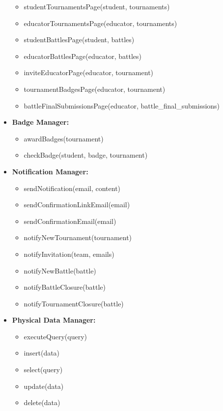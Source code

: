 \begin{itemize}
\begin{itemize}
        \item studentTournamentsPage(student, tournaments)
        \item educatorTournamentsPage(educator, tournaments)

        \item studentBattlesPage(student, battles)
        \item educatorBattlesPage(educator, battles)

        \item inviteEducatorPage(educator, tournament)
        \item tournamentBadgesPage(educator, tournament)
        \item battleFinalSubmissionsPage(educator, battle\_final\_submissions)
        
    \end{itemize}

    \item \textbf{Badge Manager:}
    \begin{itemize}
        \item awardBadges(tournament)
        \item checkBadge(student, badge, tournament)
    \end{itemize}

    \item \textbf{Notification Manager:}
    \begin{itemize}
        \item sendNotification(email, content)
        \item sendConfirmationLinkEmail(email)
        \item sendConfirmationEmail(email)
        \item notifyNewTournament(tournament)
        \item notifyInvitation(team, emails)
        \item notifyNewBattle(battle)
        \item notifyBattleClosure(battle)
        \item notifyTournamentClosure(battle)
    \end{itemize}

    \newpage

    \item \textbf{Physical Data Manager:}
    \begin{itemize}
        \item executeQuery(query)
        \item insert(data)
        \item select(query)
        \item update(data)
        \item delete(data)
    

\end{itemize}
\end{itemize}
